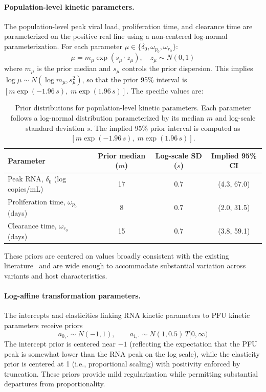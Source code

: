 \documentclass[12pt]{article}
\begin{document}
\paragraph{Population-level kinetic parameters.} The population-level peak viral load, proliferation time, and clearance time are parameterized on the positive real line using a non-centered log-normal parameterization. For each parameter $\mu \in \{\delta_0, \omega_{p_0}, \omega_{r_0}\}$:
\begin{equation*}
    \mu = m_\mu \exp(s_\mu \cdot z_\mu), \quad z_\mu \sim N(0, 1)
\end{equation*}
where $m_\mu$ is the prior median and $s_\mu$ controls the prior dispersion. This implies $\log \mu \sim N(\log m_\mu, s_\mu^2)$, so that the prior 95\% interval is $[m \exp(-1.96\, s),\; m \exp(1.96\, s)]$. The specific values are:

\begin{table}[ht]
\centering
\caption{Prior distributions for population-level kinetic parameters. Each parameter follows a log-normal distribution parameterized by its median $m$ and log-scale standard deviation $s$. The implied 95\% prior interval is computed as $[m \exp(-1.96\, s),\; m \exp(1.96\, s)]$.}
\label{tab:priors-kinetics}
\begin{tabular}{lccc}
\toprule
Parameter & Prior median ($m$) & Log-scale SD ($s$) & Implied 95\% CI \\
\midrule
Peak RNA, $\delta_0$ (log copies/mL) & 17 & 0.7 & (4.3, 67.0) \\
Proliferation time, $\omega_{p_0}$ (days) & 8 & 0.7 & (2.0, 31.5) \\
Clearance time, $\omega_{r_0}$ (days) & 15 & 0.7 & (3.8, 59.1) \\
\bottomrule
\end{tabular}
\end{table}

These priors are centered on values broadly consistent with the existing literature~\cite{hay2022quantifying,kissler2021viral,ke2022daily} and are wide enough to accommodate substantial variation across variants and host characteristics.

\paragraph{Log-affine transformation parameters.} The intercepts and elasticities linking RNA kinetic parameters to PFU kinetic parameters receive priors
\begin{equation*}
    a_{0,\cdot} \sim N(-1, 1), \qquad a_{1,\cdot} \sim N(1, 0.5)\, T[0, \infty)
\end{equation*}
The intercept prior is centered near $-1$ (reflecting the expectation that the PFU peak is somewhat lower than the RNA peak on the log scale), while the elasticity prior is centered at 1 (i.e., proportional scaling) with positivity enforced by truncation. These priors provide mild regularization while permitting substantial departures from proportionality.
\end{document}
